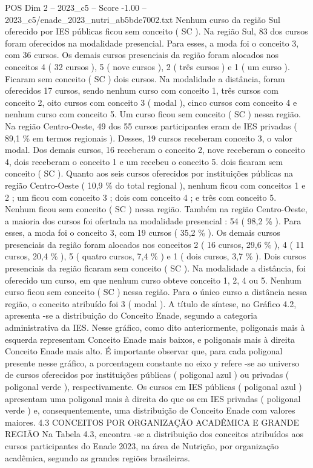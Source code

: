 \begin{textsample}{POS Dim 2 – 2023\_c5 – Score -1.00 – 2023\_c5/enade\_2023\_nutri\_ab5bde7002.txt}
Nenhum curso da região Sul oferecido por IES públicas ficou sem conceito ( SC ).
Na região Sul, 83 dos cursos foram oferecidos na modalidade presencial.
Para esses, a moda foi o conceito 3, com 36 cursos.
Os demais cursos presenciais da região foram alocados nos conceitos 4 ( 32 cursos ), 5 ( nove cursos ), 2 ( três cursos ) e 1 ( um curso ).
Ficaram sem conceito ( SC ) dois cursos.
Na modalidade a distância, foram oferecidos 17 cursos, sendo nenhum curso com conceito 1, três cursos com conceito 2, oito cursos com conceito 3 ( modal ), cinco cursos com conceito 4 e nenhum curso com conceito 5.
Um curso ficou sem conceito ( SC ) nessa região.
Na região Centro-Oeste, 49 dos 55 cursos participantes eram de IES privadas ( 89,1 \% em termos regionais ).
Desses, 19 cursos receberam conceito 3, o valor modal.
Dos demais cursos, 16 receberam o conceito 2, nove receberam o conceito 4, dois receberam o conceito 1 e um recebeu o conceito 5. dois ficaram sem conceito ( SC ).
Quanto aos seis cursos oferecidos por instituições públicas na região Centro-Oeste ( 10,9 \% do total regional ), nenhum ficou com conceitos 1 e 2 ; um ficou com conceito 3 ; dois com conceito 4 ; e três com conceito 5.
Nenhum ficou sem conceito ( SC ) nessa região.
Também na região Centro-Oeste, a maioria dos cursos foi ofertada na modalidade presencial : 54 ( 98,2 \% ).
Para esses, a moda foi o conceito 3, com 19 cursos ( 35,2 \% ).
Os demais cursos presenciais da região foram alocados nos conceitos 2 ( 16 cursos, 29,6 \% ), 4 ( 11 cursos, 20,4 \% ), 5 ( quatro cursos, 7,4 \% ) e 1 ( dois cursos, 3,7 \% ).
Dois cursos presenciais da região ficaram sem conceito ( SC ).
Na modalidade a distância, foi oferecido um curso, em que nenhum curso obteve conceito 1, 2, 4 ou 5.
Nenhum curso ficou sem conceito ( SC ) nessa região.
Para o único curso a distância nessa região, o conceito atribuído foi 3 ( modal ).
A título de síntese, no Gráfico 4.2, apresenta -se a distribuição do Conceito Enade, segundo a categoria administrativa da IES.
Nesse gráfico, como dito anteriormente, poligonais mais à esquerda representam Conceito Enade mais baixos, e poligonais mais à direita Conceito Enade mais alto.
É importante observar que, para cada poligonal presente nesse gráfico, a porcentagem constante no eixo y refere -se ao universo de cursos oferecidos por instituições públicas ( poligonal azul ) ou privadas ( poligonal verde ), respectivamente.
Os cursos em IES públicas ( poligonal azul ) apresentam uma poligonal mais à direita do que os em IES privadas ( poligonal verde ) e, consequentemente, uma distribuição de Conceito Enade com valores maiores. 4.3 CONCEITOS POR ORGANIZAÇÃO ACADÊMICA E GRANDE REGIÃO Na Tabela 4.3, encontra -se a distribuição dos conceitos atribuídos aos cursos participantes do Enade 2023, na área de Nutrição, por organização acadêmica, segundo as grandes regiões brasileiras.

\end{textsample}
